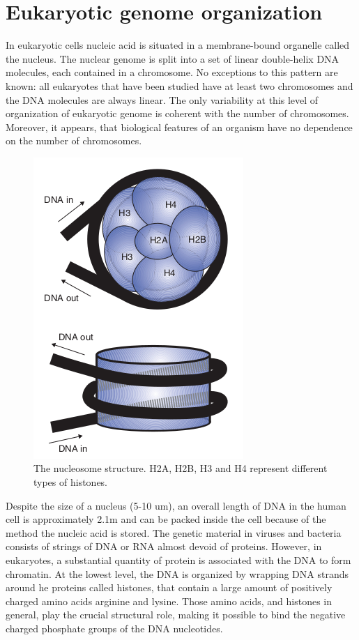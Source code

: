 \section{Eukaryotic genome organization}

In eukaryotic cells nucleic acid is situated in a membrane-bound organelle called the nucleus.
The nuclear genome is split into a set of linear double-helix DNA molecules, each contained in a chromosome. 
No exceptions to this pattern are known: all eukaryotes that have been studied have at least two chromosomes and the DNA molecules are always linear. 
The only variability at this level of organization of eukaryotic genome is coherent with the number of chromosomes. 
Moreover, it appears, that biological features of an organism have no dependence on the number of chromosomes. 

\begin{figure}[!ht]
	\centering
	\includegraphics[width=.5\textwidth]{figures/nucleoDetailed}
	\caption{The nucleosome structure. H2A, H2B, H3 and H4 represent different types of histones. \label{o:latex_friendly_zone}}
\end{figure}

Despite the size of a nucleus (5-10 um), an overall length of DNA in the human cell is approximately 2.1m and can be packed inside the cell 
because of the method the nucleic acid is stored. The genetic material in viruses and bacteria consists of strings of DNA or RNA almost devoid of proteins. 
However, in eukaryotes, a substantial quantity of protein is associated with the DNA to form chromatin. At the lowest level, the DNA is organized by 
wrapping DNA strands around he proteins called histones, that contain a large amount of positively charged amino acids arginine and lysine. 
Those amino acids, and histones in general, play the crucial structural role, making it possible to bind the negative charged phosphate groups of the DNA nucleotides.

